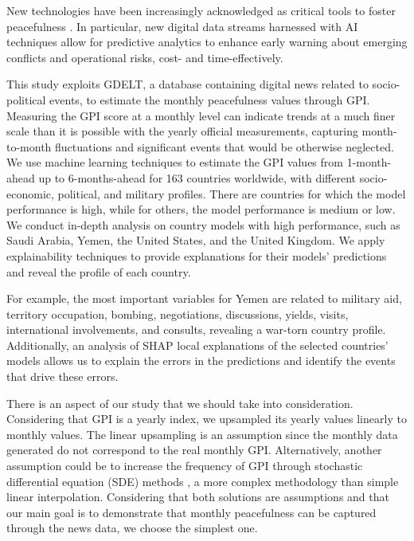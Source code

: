 \documentclass{bmcart}
\begin{document}
New technologies have been increasingly acknowledged as critical tools to foster peacefulness \cite{colaresi2017robot,hattotuwa2013big}. 
In particular, new digital data streams harnessed with AI techniques allow for predictive analytics to enhance early warning about emerging conflicts and operational risks, cost- and time-effectively.

This study exploits GDELT, a database containing digital news related to socio-political events, to estimate the monthly peacefulness values through GPI. Measuring the GPI score at a monthly level can indicate trends at a much finer scale than it is possible with the yearly official measurements, capturing month-to-month fluctuations and significant events that would be otherwise neglected. We use machine learning techniques to estimate the GPI values from 1-month-ahead up to 6-months-ahead for 163 countries worldwide, with different socio-economic, political, and military profiles. 
There are countries for which the model performance is high, while for others, the model performance is medium or low. We conduct in-depth analysis on country models with high performance, such as Saudi Arabia, Yemen, the United States, and the United Kingdom. We apply explainability techniques to provide explanations for their models' predictions and reveal the profile of each country.

For example, the most important variables for Yemen are related to military aid, territory occupation, bombing, negotiations, discussions, yields, visits, international involvements, and consults, revealing a war-torn country profile. Additionally, an analysis of SHAP local explanations of the selected countries' models allows us to explain the errors in the predictions and identify the events that drive these errors. 

There is an aspect of our study that we should take into consideration. Considering that GPI is a yearly index, we upsampled its yearly values linearly to monthly values. The linear upsampling is an assumption since the monthly data generated do not correspond to the real monthly GPI. Alternatively, another assumption could be to increase the frequency of GPI through stochastic differential equation (SDE) methods \cite{iacus2018simulation}, a more complex methodology than simple linear interpolation. 
Considering that both solutions are assumptions and that our main goal is to demonstrate that monthly peacefulness can be captured through the news data, we choose the simplest one. 
\end{document}
